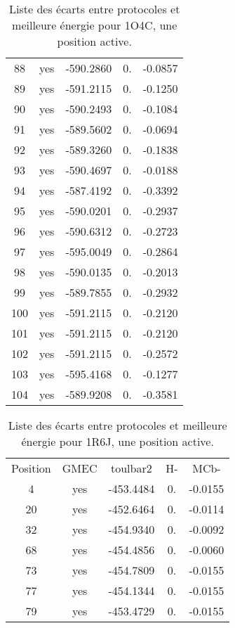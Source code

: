 \begin{table}[h]
\begin{tabular}{ccccc}
        88 & yes &  -590.2860 & 0. &  -0.0857 \\
        89 & yes &  -591.2115 & 0. &  -0.1250 \\
        90 & yes &  -590.2493 & 0. &  -0.1084 \\
        91 & yes &  -589.5602 & 0. &  -0.0694 \\
        92 & yes &  -589.3260 & 0. &  -0.1838 \\
        93 & yes &  -590.4697 & 0. &  -0.0188 \\
        94 & yes &  -587.4192 & 0. &  -0.3392 \\
        95 & yes &  -590.0201 & 0. &  -0.2937 \\
        96 & yes &  -590.6312 & 0. &  -0.2723 \\
        97 & yes &  -595.0049 & 0. &  -0.2864 \\
        98 & yes &  -590.0135 & 0. &  -0.2013 \\
        99 & yes &  -589.7855 & 0. &  -0.2932 \\
       100 & yes &  -591.2115 & 0. &  -0.2120 \\
       101 & yes &  -591.2115 & 0. &  -0.2120 \\
       102 & yes &  -591.2115 & 0. &  -0.2572 \\
       103 & yes &  -595.4168 & 0. &  -0.1277 \\
       104 & yes &  -589.9208 & 0. &  -0.3581 \\
        \bottomrule
       

      \end{tabular}      
      \caption{Liste des écarts entre protocoles et meilleure énergie pour 1O4C, une position active.}
\label{tab:result_1_active_1O4C}
    \end{table}

    \begin{table}[h]
      \centering

      \begin{tabular}{ccccc}


        \toprule
        Position & GMEC & toulbar2 & H- & MCb- \\
        \cmidrule{1-5}
         4 & yes & -453.4484 & 0. & -0.0155  \\
        20 & yes & -452.6464 & 0. & -0.0114 \\
        32 & yes & -454.9340 & 0. & -0.0092 \\
        68 & yes & -454.4856 & 0. & -0.0060 \\
        73 & yes & -454.7809 & 0. & -0.0155 \\
        77 & yes & -454.1344 & 0. & -0.0155 \\
        79 & yes & -453.4729 & 0. & -0.0155 \\
        \bottomrule
      \end{tabular}      
      \caption{Liste des écarts entre protocoles et meilleure énergie pour 1R6J, une position active.}
\label{tab:result_1_active_1R6J}
    \end{table}

